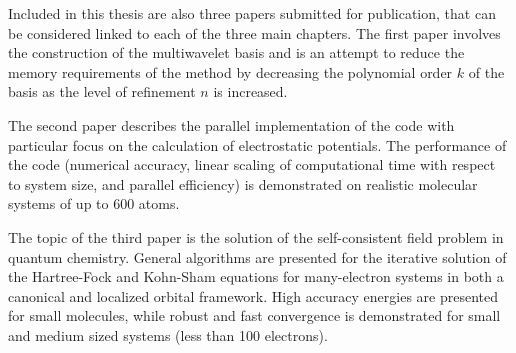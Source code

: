 Included in this thesis are also three papers submitted for publication, that can be
considered linked to each of the three main chapters. The first paper involves the
construction of the multiwavelet basis and is an attempt to reduce the memory 
requirements of the method by decreasing the polynomial order $k$ of the basis as 
the level of refinement $n$ is increased. 

The second paper describes the parallel implementation of the code with particular 
focus on the calculation of electrostatic potentials. The performance of the code 
(numerical accuracy, linear scaling of computational time with respect to system 
size, and parallel efficiency) is demonstrated on realistic molecular systems of 
up to 600 atoms.

The topic of the third paper is the solution of the self-consistent field problem
in quantum chemistry. General algorithms are presented for the iterative solution
of the Hartree-Fock and Kohn-Sham equations for many-electron systems in both a
canonical and localized orbital framework. High accuracy energies are presented 
for small molecules, while robust and fast convergence is demonstrated for small 
and medium sized systems (less than 100 electrons).


